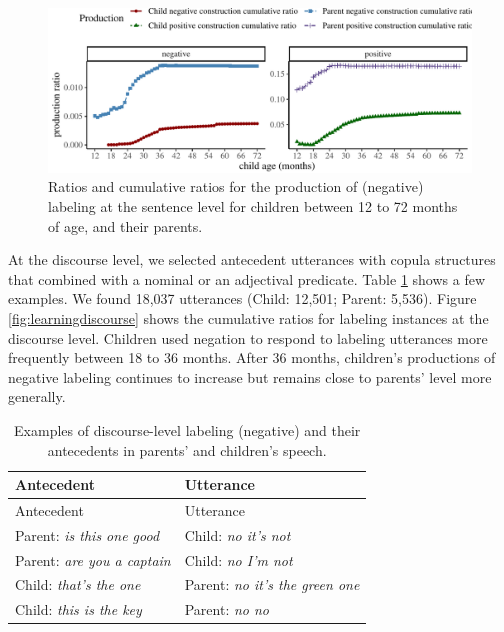 \documentclass[
  english,
  man,floatsintext]{apa6}
\begin{document}
\begin{figure}[H]

{\centering \includegraphics{neg_construction_article_files/figure-latex/learning-1} 

}

\caption{Ratios and cumulative ratios for the production of (negative) labeling at the sentence level for children between 12 to 72 months of age, and their parents.}\label{fig:learning}
\end{figure}

At the discourse level, we selected antecedent utterances with copula structures that combined with a nominal or an adjectival predicate. Table \ref{tab:dislabel} shows a few examples. We found 18,037 utterances (Child: 12,501; Parent: 5,536). Figure \ref{fig:learningdiscourse} shows the cumulative ratios for labeling instances at the discourse level. Children used negation to respond to labeling utterances more frequently between 18 to 36 months. After 36 months, children's productions of negative labeling continues to increase but remains close to parents' level more generally.

\begin{longtable}[]{@{}ll@{}}
\caption{\label{tab:dislabel} Examples of discourse-level labeling (negative) and their antecedents in parents' and children's speech.}\tabularnewline
\toprule
Antecedent & Utterance \\
\midrule
\endfirsthead
\toprule
Antecedent & Utterance \\
\midrule
\endhead
Parent: \emph{is this one good} & Child: \emph{no it's not} \\
Parent: \emph{are you a captain} & Child: \emph{no I'm not} \\
Child: \emph{that's the one} & Parent: \emph{no it's the green one} \\
Child: \emph{this is the key} & Parent: \emph{no no} \\
\bottomrule
\end{longtable}
\end{document}
